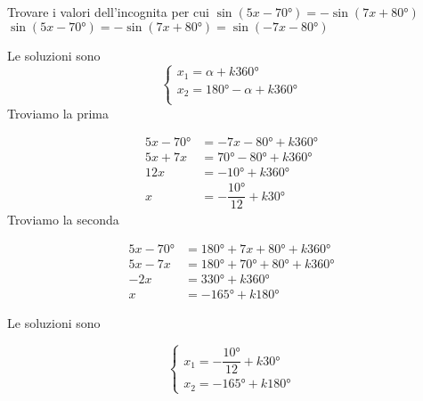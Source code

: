 \begin{exercise}
	Trovare i valori dell'incognita per cui $\sin(5x-\ang{70;;})=-\sin(7x +\ang{80;;})$
	\tcblower
$\sin(5x-\ang{70;;})=-\sin(7x +\ang{80;;})=\sin(-7x-\ang{80;;})$
	
	Le soluzioni sono 
	\[\begin{cases}
	x_1=\alpha+k\ang{360;;}\\
	x_2=\ang{180;;}-\alpha+k\ang{360;;}\\
	\end{cases}\]
	Troviamo la prima
	
	\begin{align*}
		5x-\ang{70;;}&=-7x-\ang{80;;}+k\ang{360;;}\\
		5x+7x&=\ang{70;;}-\ang{80;;}+k\ang{360;;}\\
		12x&=-\ang{10;;}+k\ang{360;;}\\
		x&=-\dfrac{\ang{10;;}}{12}+k\ang{30;;}
	\end{align*}
	Troviamo la seconda
	
	\begin{align*}
		5x-\ang{70;;}&=\ang{180;;}+7x+\ang{80;;}+k\ang{360;;}\\
		5x-7x&=\ang{180;;}+\ang{70;;}+\ang{80;;}+k\ang{360;;}\\
		-2x&=\ang{330;;}+k\ang{360;;}\\
		x&=-\ang{165;;}+k\ang{180;;}
	\end{align*}
	
	Le soluzioni sono
	
	\[\begin{cases}
	x_1=-\dfrac{\ang{10;;}}{12}+k\ang{30;;}\\
	x_2=-\ang{165;;}+k\ang{180;;}
	\end{cases}\]
\end{exercise}
